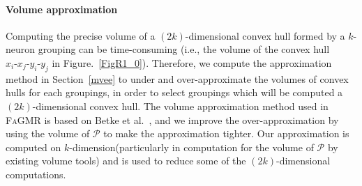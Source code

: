 \documentclass[runningheads]{llncs}
\newcommand{\ourtool}{\textsc{FaGMR}\xspace}
\begin{document}
\paragraph{Volume approximation}
Computing the precise volume of a $(2k)$-dimensional convex hull
formed by a $k$-neuron grouping can be time-consuming (i.e., the volume of the convex hull
$x_{i}\text{-}x_{j}\text{-}y_{i}\text{-}y_{j}$ in Figure.~\ref{FigR1_0}). Therefore,
we compute the approximation method in Section~\ref{mvee} to under and over-approximate the volumes
of convex hulls for each groupings, in order to select groupings which will be computed a $(2k)$-dimensional convex hull. The volume approximation method used in \ourtool is based on Betke et al.~\cite{betke1993approximating}, and we improve the over-approximation by using the volume of $\mathcal{P}$ to make the approximation tighter. Our approximation is computed on $k$-dimension(particularly in computation for the volume of $\mathcal{P}$ by existing volume tools) and is used to reduce some of the $(2k)$-dimensional computations.
\end{document}
